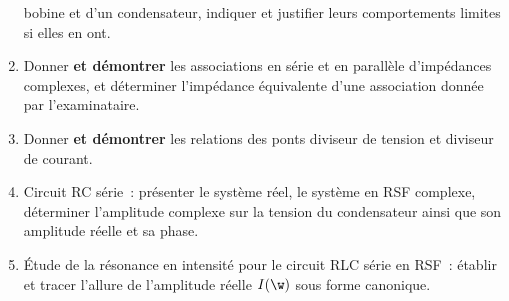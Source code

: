 \documentclass[a4paper, 12pt, final, garamond]{book}
\begin{document}
\begin{enumerate}
        bobine et d'un condensateur, indiquer et justifier leurs comportements
        limites si elles en ont.
    \item Donner \textbf{et démontrer} les associations en série et en parallèle
        d'impédances complexes, et déterminer l'impédance équivalente d'une
        association donnée par l'examinataire.
    \item Donner \textbf{et démontrer} les relations des ponts diviseur de tension
        et diviseur de courant.
    \item Circuit RC série~: présenter le système réel, le système en RSF
        complexe, déterminer l'amplitude complexe sur la tension du condensateur
        ainsi que son amplitude réelle et sa phase.
    \item Étude de la résonance en intensité pour le circuit RLC série en RSF~:
        établir et tracer l'allure de l'amplitude réelle $I(\w)$ sous forme
        canonique.
\end{enumerate}
\end{document}

